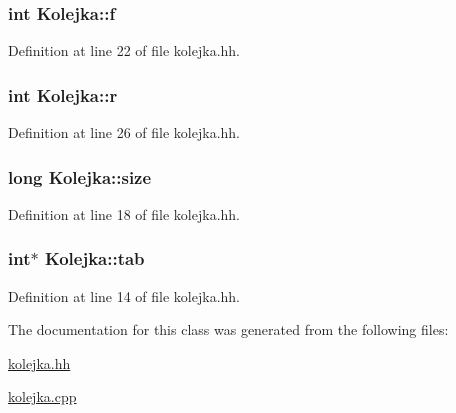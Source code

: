 \subsubsection[{f}]{\setlength{\rightskip}{0pt plus 5cm}int Kolejka\+::f\hspace{0.3cm}{\ttfamily [private]}}\label{class_kolejka_ae66597dc9eb1fcc210b075f8aa7ff77f}


Definition at line 22 of file kolejka.\+hh.

\hypertarget{class_kolejka_ae16213a5b751800eb48da6bede435ad0}{}
\subsubsection[{r}]{\setlength{\rightskip}{0pt plus 5cm}int Kolejka\+::r\hspace{0.3cm}{\ttfamily [private]}}\label{class_kolejka_ae16213a5b751800eb48da6bede435ad0}


Definition at line 26 of file kolejka.\+hh.

\hypertarget{class_kolejka_a84898848de8e77a76a6f2e4a7393b4bb}{}
\subsubsection[{size}]{\setlength{\rightskip}{0pt plus 5cm}long Kolejka\+::size\hspace{0.3cm}{\ttfamily [private]}}\label{class_kolejka_a84898848de8e77a76a6f2e4a7393b4bb}


Definition at line 18 of file kolejka.\+hh.

\hypertarget{class_kolejka_a49e444e7bd7b91a78bc2a46426b73128}{}
\subsubsection[{tab}]{\setlength{\rightskip}{0pt plus 5cm}int$\ast$ Kolejka\+::tab\hspace{0.3cm}{\ttfamily [private]}}\label{class_kolejka_a49e444e7bd7b91a78bc2a46426b73128}


Definition at line 14 of file kolejka.\+hh.



The documentation for this class was generated from the following files\+:\begin{DoxyCompactItemize}
\item 
\hyperlink{kolejka_8hh}{kolejka.\+hh}\item 
\hyperlink{kolejka_8cpp}{kolejka.\+cpp}\end{DoxyCompactItemize}
